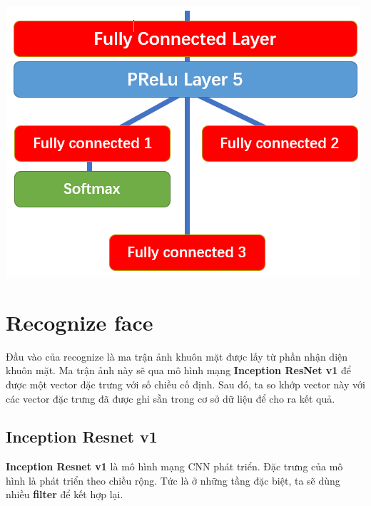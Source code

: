 \documentclass[12pt]{extreport}
\begin{document}
\begin{center}
\includegraphics[scale=0.5]{Image/MTCNN_O_net_last}
\end{center}

\section{Recognize face}
Đầu vào của recognize là ma trận ảnh khuôn mặt được lấy từ phần nhận diện khuôn mặt. Ma trận ảnh này sẽ qua mô hình mạng \textbf{Inception ResNet v1} để được một vector đặc trưng với số chiều cố định. Sau đó, ta so khớp vector này với các vector đặc trưng đã được ghi sẵn trong cơ sở dữ liệu để cho ra kết quả.

\subsection{Inception Resnet v1}
\textbf{Inception Resnet v1} là mô hình mạng CNN phát triển. Đặc trưng của mô hình là phát triển theo chiều rộng. Tức là ở những tầng đặc biệt, ta sẽ dùng nhiều \textbf{filter} để kết hợp lại.
\end{document}
